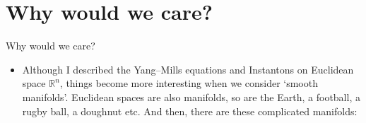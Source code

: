 \documentclass{beamer}
\theoremstyle{definition}
\begin{document}
    \section{Why would we care?}
    \begin{frame}{Why would we care?}{}
		\begin{itemize}
            \item<1-> {Although I described the Yang--Mills equations and Instantons on Euclidean space $\mathbb{R}^n$, things become more interesting when we consider `smooth manifolds'. Euclidean spaces are also manifolds, so are the Earth, a football, a rugby ball, a doughnut etc. And then, there are these complicated manifolds:}
\end{itemize}
\end{frame}
\end{document}

